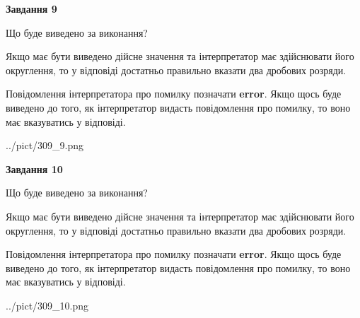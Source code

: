 \documentclass[12pt, ukrainian]{article}
\begin{document}
{\begin {Large}
{\begin {center}\textbf{Завдання 9}\end {center}}\par
Що буде виведено за виконання? \par

Якщо має бути виведено дійсне значення та інтерпретатор має здійснювати його округлення, 
то у відповіді достатньо правильно вказати два дробових розряди.

Повідомлення інтерпретатора про помилку позначати \textbf{error}.
Якщо щось буде виведено до того, як інтерпретатор видасть повідомлення про помилку, 
то воно має вказуватись у відповіді. \par

\begin{center}
	{../pict/309_9.png}
\end{center}
\newpage

{\begin {center}\textbf{Завдання 10}\end {center}}\par
Що буде виведено за виконання? \par

Якщо має бути виведено дійсне значення та інтерпретатор має здійснювати його округлення, 
то у відповіді достатньо правильно вказати два дробових розряди.

Повідомлення інтерпретатора про помилку позначати \textbf{error}.
Якщо щось буде виведено до того, як інтерпретатор видасть повідомлення про помилку, 
то воно має вказуватись у відповіді. \par

\begin{center}
	{../pict/309_10.png}
\end{center}
\newpage

\end {Large}}
\end{document}
